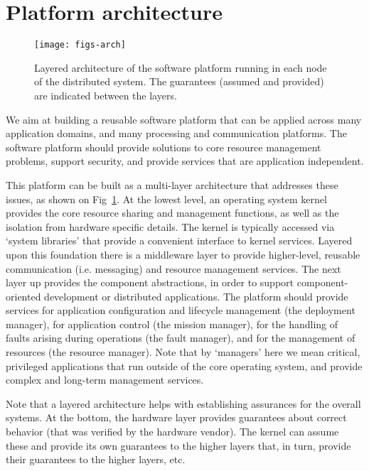 \section{Platform architecture}
\label{sec:architecture}
\begin{figure}[t]
\centering \texttt{[image: figs-arch]}
\caption{Layered architecture of the software platform running in each
  node of the distributed system. The guarantees (assumed and
  provided) are indicated between the layers.}
\label{fig:layered_architecture}
\vspace{-0.2in}
\end{figure}
We aim at building a reusable software platform that can be applied
across many application domains, and many processing and communication
platforms. The software platform should provide solutions to core
resource management problems, support security, and provide services
that are application independent.

This platform  can be built as a multi-layer architecture that 
addresses these issues, as shown on Fig~\ref{fig:layered_architecture}. 
At the lowest level, an operating system kernel provides the core resource sharing and
management functions, as well as the isolation from hardware specific
details. The kernel is typically accessed via `system libraries' that
provide a convenient interface to kernel services. Layered upon this
foundation there is a middleware layer to provide higher-level, reusable
communication (i.e. messaging) and resource management services. The
next layer up provides the component abstractions, in order to support
component-oriented development or distributed applications. The
platform should provide services for application configuration
and lifecycle management (the deployment manager), for application
control (the mission manager), for the handling of faults arising
during operations (the fault manager), and for the management of
resources (the resource manager). Note that by `managers' here we mean
critical, privileged applications that run outside of the core
operating system, and provide complex and long-term management services.

Note that a layered architecture helps with establishing assurances
for the overall systems. At the bottom, the hardware layer provides
guarantees about correct behavior (that was verified by the hardware
vendor). The kernel can assume these and provide its own guarantees to
the higher layers that, in turn, provide their guarantees to the higher 
layers, etc.



